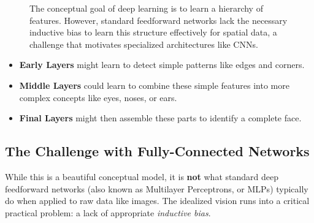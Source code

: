 \documentclass[11pt]{article}
\begin{document}
\begin{figure}[h!]
\caption{The conceptual goal of deep learning is to learn a hierarchy of features. However, standard feedforward networks lack the necessary inductive bias to learn this structure effectively for spatial data, a challenge that motivates specialized architectures like CNNs.}
\label{fig:hierarchical_features}
\end{figure}

\begin{itemize}
    \item \textbf{Early Layers} might learn to detect simple patterns like edges and corners.
    \item \textbf{Middle Layers} could learn to combine these simple features into more complex concepts like eyes, noses, or ears.
    \item \textbf{Final Layers} might then assemble these parts to identify a complete face.
\end{itemize}

\subsection{The Challenge with Fully-Connected Networks}
While this is a beautiful conceptual model, it is \textbf{not} what standard deep feedforward networks (also known as Multilayer Perceptrons, or MLPs) typically do when applied to raw data like images. The idealized vision runs into a critical practical problem: a lack of appropriate \textit{inductive bias}.
\end{document}

